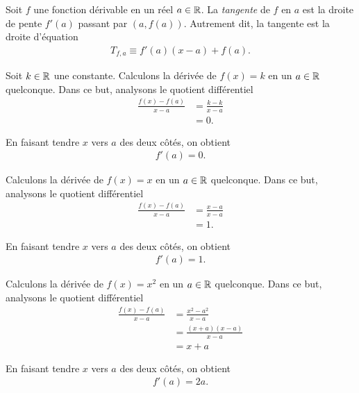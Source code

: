 \documentclass[main.tex]{subfiles}
\begin{document}
\begin{definition}
    [Tangente]

    Soit $f$ une fonction dérivable en un réel $a \in \mathbb{R}$.
    La \emph{tangente} de $f$ en $a$ est la droite de pente $f'(a)$ passant par $(a, f(a))$.
    Autrement dit,
    la tangente est la droite d'équation
    \begin{align}
        T_{f, a} \equiv f'(a) (x - a) + f(a).
    \end{align}
\end{definition}

\begin{example}

    Soit $k \in \mathbb{R}$ une constante.
    Calculons la dérivée de $f(x) = k$ en un $a \in \mathbb{R}$ quelconque.
    Dans ce but,
    analysons le quotient différentiel
    \begin{align}
        \frac {f(x) - f(a)}{x - a}
        &= \frac {k-k}{x - a}\\
        &= 0.
    \end{align}

    En faisant tendre $x$ vers $a$ des deux côtés,
    on obtient
    \begin{align}
        f'(a) = 0.
    \end{align}
\end{example}

\begin{example}
    [Dérivée de $x$]

    Calculons la dérivée de $f(x) = x$ en un $a \in \mathbb{R}$ quelconque.
    Dans ce but,
    analysons le quotient différentiel
    \begin{align}
        \frac {f(x) - f(a)}{x - a}
        &= \frac {x - a}{x - a}\\
        &= 1.
    \end{align}

    En faisant tendre $x$ vers $a$ des deux côtés,
    on obtient
    \begin{align}
        f'(a) = 1.
    \end{align}
\end{example}

\begin{example}
    [Dérivée de $x^2$]

    Calculons la dérivée de $f(x) = x^2$ en un $a \in \mathbb{R}$ quelconque.
    Dans ce but,
    analysons le quotient différentiel
    \begin{align}
        \frac {f(x) - f(a)}{x - a}
        &= \frac {x^2 - a^2}{x - a}\\
        &= \frac {(x + a)(x - a)}{x - a}\\
        &= x + a
    \end{align}

    En faisant tendre $x$ vers $a$ des deux côtés,
    on obtient
    \begin{align}
        f'(a) = 2a.
    \end{align}
\end{example}
\end{document}
